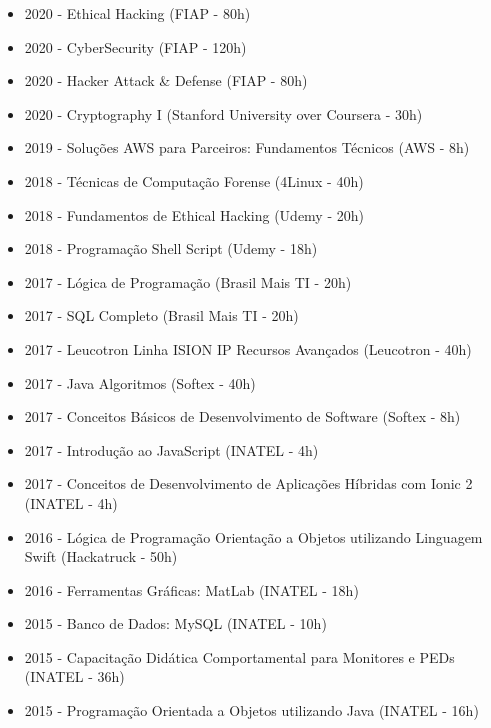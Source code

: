 \documentclass[10pt,a4paper,ragged2e, normalphoto]{altacv}
\begin{document}
\begin{fullwidth}

\begin{itemize}
    \item 2020 - Ethical Hacking (FIAP - 80h)
    \item 2020 - CyberSecurity (FIAP - 120h)
    \item 2020 - Hacker Attack \& Defense (FIAP - 80h)
    \item 2020 - Cryptography I (Stanford University over Coursera - 30h)
    \item 2019 - Soluções AWS para Parceiros: Fundamentos Técnicos (AWS - 8h)
    \item 2018 - Técnicas de Computação Forense (4Linux - 40h)
    \item 2018 - Fundamentos de Ethical Hacking (Udemy - 20h)
    \item 2018 - Programação Shell Script (Udemy - 18h)
    \item 2017 - Lógica de Programação (Brasil Mais TI - 20h)
    \item 2017 - SQL Completo (Brasil Mais TI - 20h)
    \item 2017 - Leucotron Linha ISION IP Recursos Avançados (Leucotron - 40h)
    \item 2017 - Java Algoritmos (Softex - 40h)
    \item 2017 - Conceitos Básicos de Desenvolvimento de Software (Softex - 8h)
    \item 2017 - Introdução ao JavaScript (INATEL - 4h)
    \item 2017 - Conceitos de Desenvolvimento de Aplicações Híbridas com Ionic 2 (INATEL - 4h)
    \item 2016 - Lógica de Programação Orientação a Objetos utilizando Linguagem Swift (Hackatruck - 50h)
    \item 2016 - Ferramentas Gráficas: MatLab (INATEL - 18h)
    \item 2015 - Banco de Dados: MySQL (INATEL - 10h)
    \item 2015 - Capacitação Didática Comportamental para Monitores e PEDs (INATEL - 36h)
    \item 2015 - Programação Orientada a Objetos utilizando Java (INATEL - 16h)
\end{itemize}

\end{fullwidth}
\end{document}
